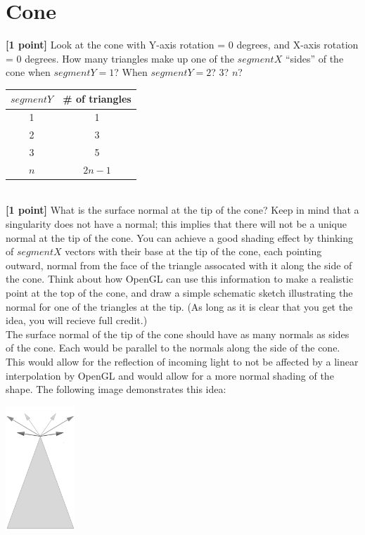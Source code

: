 \documentclass[10pt,twocolumn]{article}
\begin{document}
\section{Cone}
{\bf [1 point]} Look at the cone with Y-axis rotation = 0 degrees, and X-axis rotation = 0 degrees. How many triangles make up one of the $segmentX$ ``sides'' of the cone when $segmentY=1$? When $segmentY=2$? 3? $n$? \newline \newline
\begin{tabular}{c|c}
$segmentY$ & \# of triangles \\ \hline
1 & 1 \\
2 & 3 \\
3 & 5 \\
$n$ & $2n - 1$
\end{tabular}
\vspace{2em}\\
{\bf [1 point]} What is the surface normal at the tip of the cone? Keep in mind that a singularity does not have a normal; this implies that there will not be a unique normal at the tip of the cone. You can achieve a good shading effect by thinking of $segmentX$ vectors with their base at the tip of the cone, each pointing outward, normal from the face of the triangle assocated with it along the side of the cone. Think about how OpenGL can use this information to make a realistic point at the top of the cone, and draw a simple schematic sketch illustrating the normal for one of the triangles at the tip. (As long as it is clear that you get the idea, you will recieve full credit.)
\vspace{2em}\\
The surface normal of the tip of the cone should have as many normals as sides of the cone. Each would be parallel to the normals along the side of the cone. This would allow for the reflection of incoming light to not be affected by a linear interpolation by OpenGL and would allow for a more normal shading of the shape. The following image demonstrates this idea: \\
\begin{center}
\includegraphics[width=7em]{graphicshw1cone} \\
\end{center}
\end{document}
